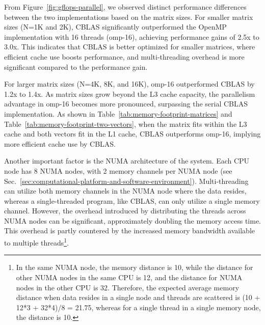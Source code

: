 From Figure~\ref{fig:gflops-parallel}, we observed distinct performance differences between the two implementations based on the matrix sizes. For smaller matrix sizes (N=1K and 2K), CBLAS significantly outperformed the OpenMP implementation with 16 threads (omp-16), achieving performance gains of 2.5x to 3.0x. This indicates that CBLAS is better optimized for smaller matrices, where efficient cache use boosts performance, and multi-threading overhead is more significant compared to the performance gain.

For larger matrix sizes (N=4K, 8K, and 16K), omp-16 outperformed CBLAS by 1.2x to 1.4x. As matrix sizes grow beyond the L3 cache capacity, the parallelism advantage in omp-16 becomes more pronounced, surpassing the serial CBLAS implementation. As shown in Table~\ref{tab:memory-footprint-matrices} and Table~\ref{tab:memory-footprint-two-vectors}, when the matrix fits within the L3 cache and both vectors fit in the L1 cache, CBLAS outperforms omp-16, implying more efficient cache use by CBLAS.

Another important factor is the NUMA architecture of the system. Each CPU node has 8 NUMA nodes, with 2 memory channels per NUMA node (see Sec.~\ref{sec:computational-platform-and-software-environment}). Multi-threading can utilize both memory channels in the NUMA node where the data resides, whereas a single-threaded program, like CBLAS, can only utilize a single memory channel. However, the overhead introduced by distributing the threads across NUMA nodes can be significant, approximately doubling the memory access time. This overhead is partly countered by the increased memory bandwidth available to multiple threads\footnote{In the same NUMA node, the memory distance is 10, while the distance for other NUMA nodes in the same CPU is 12, and the distance for NUMA nodes in the other CPU is 32\cite{usami2024numactl}. Therefore, the expected average memory distance when data resides in a single node and threads are scattered is (10 + 12*3 + 32*4)/8 = 21.75, whereas for a single thread in a single memory node, the distance is 10.}.


